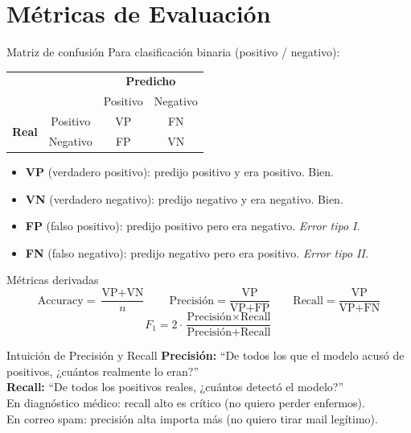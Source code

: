 \documentclass[aspectratio=169]{beamer}
\begin{document}
\section{Métricas de Evaluación}

\begin{frame}{Matriz de confusión}
  Para clasificación binaria (positivo / negativo):

  \medskip
  \begin{center}
  \begin{tabular}{cc|cc}
    & & \multicolumn{2}{c}{\textbf{Predicho}} \\
    & & Positivo & Negativo \\
    \hline
    \multirow{2}{*}{\textbf{Real}} & Positivo & VP & FN \\
    & Negativo & FP & VN \\
  \end{tabular}
  \end{center}

  \medskip
  \begin{itemize}
    \item \textbf{VP} (verdadero positivo): predijo positivo y era positivo. Bien.
    \item \textbf{VN} (verdadero negativo): predijo negativo y era negativo. Bien.
    \item \textbf{FP} (falso positivo): predijo positivo pero era negativo. \textit{Error tipo I.}
    \item \textbf{FN} (falso negativo): predijo negativo pero era positivo. \textit{Error tipo II.}
  \end{itemize}
\end{frame}

\begin{frame}{Métricas derivadas}
  \[
    \text{Accuracy} = \frac{\text{VP}+\text{VN}}{n}
    \qquad
    \text{Precisión} = \frac{\text{VP}}{\text{VP}+\text{FP}}
    \qquad
    \text{Recall} = \frac{\text{VP}}{\text{VP}+\text{FN}}
  \]
  \[
    F_1 = 2\cdot\frac{\text{Precisión}\times\text{Recall}}{\text{Precisión}+\text{Recall}}
  \]

  \medskip
  \begin{exampleblock}{Intuición de Precisión y Recall}
    \textbf{Precisión:} ``De todos los que el modelo acusó de positivos, ¿cuántos realmente lo eran?''\\
    \textbf{Recall:} ``De todos los positivos reales, ¿cuántos detectó el modelo?''\\[4pt]
    En diagnóstico médico: recall alto es crítico (no quiero perder enfermos).\\
    En correo spam: precisión alta importa más (no quiero tirar mail legítimo).
  \end{exampleblock}
\end{frame}
\end{document}
